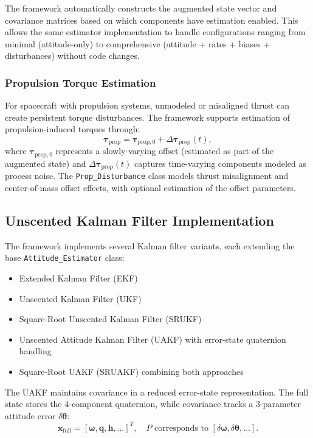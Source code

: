 \documentclass[conference]{IEEEtran}
\begin{document}
The framework automatically constructs the augmented state vector and covariance matrices based on which components have estimation enabled. This allows the same estimator implementation to handle configurations ranging from minimal (attitude-only) to comprehensive (attitude + rates + biases + disturbances) without code changes.

\subsubsection{Propulsion Torque Estimation}
For spacecraft with propulsion systems, unmodeled or misaligned thrust can create persistent torque disturbances. The framework supports estimation of propulsion-induced torques through:
\begin{equation}
\boldsymbol{\tau}_{\text{prop}} = \boldsymbol{\tau}_{\text{prop},0} + \Delta\boldsymbol{\tau}_{\text{prop}}(t),
\end{equation}
where $\boldsymbol{\tau}_{\text{prop},0}$ represents a slowly-varying offset (estimated as part of the augmented state) and $\Delta\boldsymbol{\tau}_{\text{prop}}(t)$ captures time-varying components modeled as process noise. The \texttt{Prop\_Disturbance} class models thrust misalignment and center-of-mass offset effects, with optional estimation of the offset parameters.


\subsection{Unscented Kalman Filter Implementation}\label{subsec:ukf}

The framework implements several Kalman filter variants, each extending the base \texttt{Attitude\_Estimator} class:
\begin{itemize}
    \item Extended Kalman Filter (EKF)
    \item Unscented Kalman Filter (UKF)
    \item Square-Root Unscented Kalman Filter (SRUKF)
    \item Unscented Attitude Kalman Filter (UAKF) with error-state quaternion handling
    \item Square-Root UAKF (SRUAKF) combining both approaches
\end{itemize}

The UAKF maintains covariance in a reduced error-state representation. The full state stores the 4-component quaternion, while covariance tracks a 3-parameter attitude error $\delta\boldsymbol{\theta}$:
\begin{equation}
\mathbf{x}_{\text{full}} = [\boldsymbol{\omega}, \mathbf{q}, \mathbf{h}, \dots]^T, \quad
P \text{ corresponds to } [\delta\boldsymbol{\omega}, \delta\boldsymbol{\theta}, \dots].
\end{equation}
\end{document}

